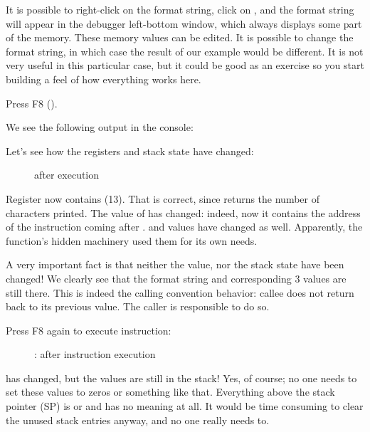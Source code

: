 It is possible to right-click on the format string, click on ,
and the format string will appear in the debugger left-bottom window, which always displays some part of the memory.
These memory values can be edited.
It is possible to change the format string, in which case the result of our example would be different.
It is not very useful in this particular case, but it could be good as an exercise so you start building a feel of how everything works here.

\clearpage
Press F8 (\stepover).

We see the following output in the console:



Let's see how the registers and stack state have changed: 

\begin{figure}[H]
\centering
{}
\caption{\olly after \printf{} execution}
\label{fig:printf3_olly_3}
\end{figure}

Register \EAX now contains  (13).
That is correct, since \printf returns the number of characters printed. 
The value of \EIP has changed: indeed, now it contains the address of the instruction coming after 
.
\ECX and \EDX values have changed as well.
Apparently, the \printf function's hidden machinery used them for its own needs.

A very important fact is that neither the \ESP value, nor the stack state have been changed!
We clearly see that the format string and corresponding 3 values are still there.
This is indeed the  calling convention behavior: \gls{callee} does not return \ESP back to its previous value.
The \gls{caller} is responsible to do so.

\clearpage
Press F8 again to execute  instruction:

\begin{figure}[H]
\centering
{}
\caption{\olly: after  instruction execution}
\label{fig:printf3_olly_4}
\end{figure}

\ESP has changed, but the values are still in the stack!
Yes, of course; no one needs to set these values to zeros or something like that.
Everything above the stack pointer (\ac{SP}) 
is  or \IT{\garbage{}} and has no meaning at all.
It would be time consuming to clear the unused stack entries anyway, and no one really needs to.

